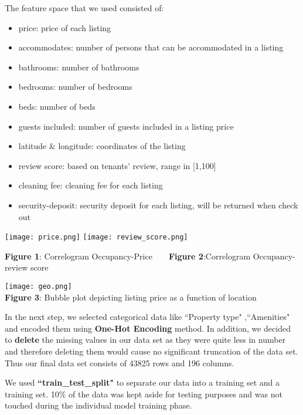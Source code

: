 \documentclass[12pt]{article}
\begin{document}
\noindent The feature space that we used consisted of:
\begin{itemize}

\item price: price of each listing
\item accommodates: number of persons that can be accommodated in a listing
\item bathrooms: number of bathrooms
\item bedrooms: number of bedrooms
\item beds: number of beds
\item guests included: number of guests included in a listing price
\item latitude \& longitude: coordinates of the listing
\item review score: based on tenants' review, range in [1,100]
\item cleaning fee: cleaning fee for each listing
\item security-deposit: security deposit for each listing, will be returned when check out
\end{itemize}

\noindent 

\begin{center}
\texttt{[image: price.png]}
\texttt{[image: review\_score.png]}
\end{center}
\textbf{Figure 1}: Correlogram Occupancy-Price 
\,\,\,\,\,\,\,\,
   \textbf{Figure 2}:Correlogram Occupancy-review score


\begin{center}
\texttt{[image: geo.png]}
\\\textbf{Figure 3}: Bubble plot depicting listing price as a function of location
\end{center}

\noindent In the next step, we selected categorical data like ``Property type" ,``Amenities" and encoded them using \textbf{One-Hot Encoding} method. In addition, we decided to \textbf{delete} the missing values in our data set as they were quite less in number and therefore deleting them would cause no significant truncation of the data set. Thus our final data set consists of 43825 rows and 196 columns.   


\noindent We used \textbf{``train\_test\_split"} to separate our data into a training set and a training set. 10\% of the data was kept aside for testing purposes and was not touched during the individual model training phase.
\end{document}
